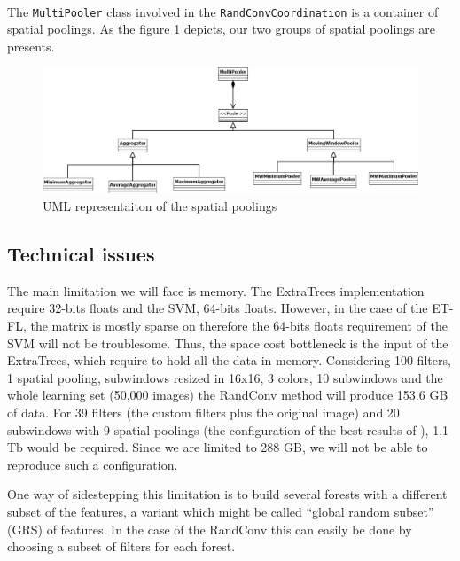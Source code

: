 \documentclass[a4paper]{report}
\begin{document}
		
		\paragraph{}
		The \texttt{MultiPooler} class involved in the \texttt{RandConvCoordination} is a container of spatial poolings. As the figure \ref{fig:uml-pooling} depicts, our two groups of spatial poolings are presents.
		
		
		\begin{figure}
			\centering
				\includegraphics[width=1.00\textwidth]{images/uml-pooling.png}
			\caption{UML representaiton of the spatial poolings}
			\label{fig:uml-pooling}
		\end{figure}
		
		
		
		
		
		\subsection{Technical issues}
		The main limitation we will face is memory. The ExtraTrees implementation require 32-bits floats and the SVM, 64-bits floats. However, in the case of the ET-FL, the matrix is mostly sparse on therefore the 64-bits floats requirement of the SVM will not be troublesome. Thus, the space cost bottleneck is the input of the ExtraTrees, which require to hold all the data in memory. Considering 100 filters, 1 spatial pooling, subwindows resized in 16x16, 3 colors, 10 subwindows and the whole learning set (50,000 images) the RandConv method will produce 153.6 GB of data. For 39 filters (the custom filters plus the original image) and 20 subwindows with 9 spatial poolings (the configuration of the best results of \cite{}), 1,1 Tb would be required. Since we are limited to 288 GB, we will not be able to reproduce such a configuration.
		\par
		One way of sidestepping this limitation is to build several forests with a different subset of the features, a variant which might be called ``global random subset'' (GRS) of features. 
		In the case of the RandConv this can easily be done by choosing a subset of filters for each forest.
		
\end{document}
